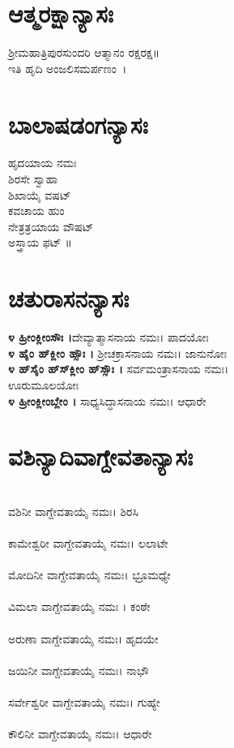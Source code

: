 \section{ಆತ್ಮರಕ್ಷಾನ್ಯಾಸಃ}
 ಶ್ರೀಮಹಾತ್ರಿಪುರಸುಂದರಿ ಆತ್ಮಾನಂ ರಕ್ಷರಕ್ಷ॥\\ಇತಿ ಹೃದಿ ಅಂಜಲಿಸಮರ್ಪಣಂ~।
\section{ಬಾಲಾಷಡಂಗನ್ಯಾಸಃ}
 ಹೃದಯಾಯ ನಮಃ\\
 ಶಿರಸೇ ಸ್ವಾಹಾ\\
ಶಿಖಾಯೈ ವಷಟ್\\
 ಕವಚಾಯ ಹುಂ\\
ನೇತ್ರತ್ರಯಾಯ ವೌಷಟ್\\
 ಅಸ್ತ್ರಾಯ ಫಟ್ ॥
\section{ಚತುರಾಸನನ್ಯಾಸಃ}
{\bfseries ೪ ಹ್ರೀಂಕ್ಲೀಂಸೌಃ ।}ದೇವ್ಯಾತ್ಮಾಸನಾಯ ನಮಃ। ಪಾದಯೋಃ\\
{\bfseries ೪ ಹೈಂ ಹ್‌ಕ್ಲೀಂ ಹ್ಸೌಃ ।} ಶ್ರೀಚಕ್ರಾಸನಾಯ ನಮಃ। ಜಾನುನೋಃ\\
{\bfseries ೪ ಹ್‌ಸೈಂ ಹ್‌ಸ್‌ಕ್ಲೀಂ ಹ್‌ಸ್ಸೌಃ ।} ಸರ್ವಮಂತ್ರಾಸನಾಯ ನಮಃ।\\ಊರುಮೂಲಯೋಃ\\
{\bfseries ೪ ಹ್ರೀಂಕ್ಲೀಂಬ್ಲೇಂ ।} ಸಾಧ್ಯಸಿದ್ಧಾಸನಾಯ ನಮಃ। ಆಧಾರೇ
\section{ವಶಿನ್ಯಾದಿವಾಗ್ದೇವತಾನ್ಯಾಸಃ}
\\ ವಶಿನೀ ವಾಗ್ದೇವತಾಯೈ ನಮಃ। ಶಿರಸಿ\\
\\ ಕಾಮೇಶ್ವರೀ ವಾಗ್ದೇವತಾಯೈ ನಮಃ। ಲಲಾಟೇ\\
\\ ಮೋದಿನೀ ವಾಗ್ದೇವತಾಯೈ ನಮಃ। ಭ್ರೂಮಧ್ಯೇ\\
\\ ವಿಮಲಾ ವಾಗ್ದೇವತಾಯೈ ನಮಃ । ಕಂಠೇ\\
\\ ಅರುಣಾ ವಾಗ್ದೇವತಾಯೈ ನಮಃ। ಹೃದಯೇ\\
\\ ಜಯಿನೀ ವಾಗ್ದೇವತಾಯೈ ನಮಃ। ನಾಭೌ\\
\\ ಸರ್ವೇಶ್ವರೀ ವಾಗ್ದೇವತಾಯೈ ನಮಃ। ಗುಹ್ಯೇ\\
\\ ಕೌಲಿನೀ ವಾಗ್ದೇವತಾಯೈ ನಮಃ। ಆಧಾರೇ
